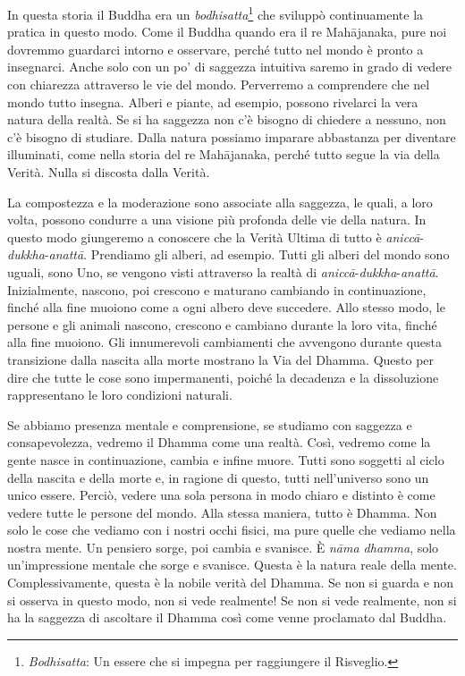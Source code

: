 In questa storia il Buddha era un \emph{bodhisatta}\footnote{\emph{Bodhisatta}:
  Un essere che si impegna per raggiungere il Risveglio.} che sviluppò
continuamente la pratica in questo modo. Come il Buddha quando era il re
Mahājanaka, pure noi dovremmo guardarci intorno e osservare, perché
tutto nel mondo è pronto a insegnarci. Anche solo con un po' di saggezza
intuitiva saremo in grado di vedere con chiarezza attraverso le vie del
mondo. Perverremo a comprendere che nel mondo tutto insegna. Alberi e
piante, ad esempio, possono rivelarci la vera natura della realtà. Se si
ha saggezza non c'è bisogno di chiedere a nessuno, non c'è bisogno di
studiare. Dalla natura possiamo imparare abbastanza per diventare
illuminati, come nella storia del re Mahājanaka, perché tutto segue la
via della Verità. Nulla si discosta dalla Verità.

La compostezza e la moderazione sono associate alla saggezza, le quali,
a loro volta, possono condurre a una visione più profonda delle vie
della natura. In questo modo giungeremo a conoscere che la Verità Ultima
di tutto è \emph{aniccā}-\emph{dukkha}-\emph{anattā}. Prendiamo gli
alberi, ad esempio. Tutti gli alberi del mondo sono uguali, sono Uno, se
vengono visti attraverso la realtà di
\emph{aniccā}-\emph{dukkha}-\emph{anattā}. Inizialmente, nascono, poi
crescono e maturano cambiando in continuazione, finché alla fine muoiono
come a ogni albero deve succedere. Allo stesso modo, le persone e gli
animali nascono, crescono e cambiano durante la loro vita, finché alla
fine muoiono. Gli innumerevoli cambiamenti che avvengono durante questa
transizione dalla nascita alla morte mostrano la Via del Dhamma. Questo
per dire che tutte le cose sono impermanenti, poiché la decadenza e la
dissoluzione rappresentano le loro condizioni naturali.

Se abbiamo presenza mentale e comprensione, se studiamo con saggezza e
consapevolezza, vedremo il Dhamma come una realtà. Così, vedremo come la
gente nasce in continuazione, cambia e infine muore. Tutti sono soggetti
al ciclo della nascita e della morte e, in ragione di questo, tutti
nell'universo sono un unico essere. Perciò, vedere una sola persona in
modo chiaro e distinto è come vedere tutte le persone del mondo. Alla
stessa maniera, tutto è Dhamma. Non solo le cose che vediamo con i
nostri occhi fisici, ma pure quelle che vediamo nella nostra mente. Un
pensiero sorge, poi cambia e svanisce. È \emph{nāma dhamma}, solo
un'impressione mentale che sorge e svanisce. Questa è la natura reale
della mente. Complessivamente, questa è la nobile verità del Dhamma. Se
non si guarda e non si osserva in questo modo, non si vede realmente! Se
non si vede realmente, non si ha la saggezza di ascoltare il Dhamma così
come venne proclamato dal Buddha.

